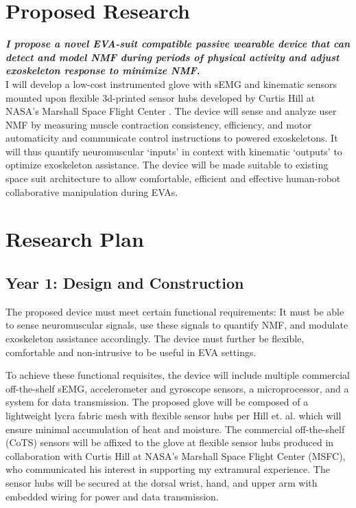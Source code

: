 \documentclass{article}
\begin{document}
\section{Proposed Research}

\textbf{\emph{I propose a novel EVA-suit compatible passive wearable device that can detect and model NMF during periods of physical activity and adjust exoskeleton response to minimize NMF.}}\\

I will develop a low-cost instrumented glove with sEMG and kinematic sensors mounted upon flexible 3d-printed sensor hubs developed by Curtis Hill at NASA's Marshall Space Flight Center \cite{CurtisHillFlexible2020}. The device will sense and analyze user NMF by measuring muscle contraction consistency, efficiency, and motor automaticity \cite{Celik2010NormalizedMQ} and communicate control instructions to powered exoskeletons. It will thus quantify neuromuscular ‘inputs’ in context with kinematic ‘outputs’ to optimize exoskeleton assistance. The device will be made suitable to existing space suit architecture to allow comfortable, efficient and effective human-robot collaborative manipulation during EVAs.

\section{Research Plan}
\subsection{Year 1: Design and Construction} 
The proposed device must meet certain functional requirements: It must be able to sense neuromuscular signals, use these signals to quantify NMF, and modulate exoskeleton assistance accordingly. The device must further be flexible, comfortable and non-intrusive to be useful in EVA settings.

To achieve these functional requisites, the device will include multiple commercial off-the-shelf sEMG, accelerometer and gyroscope sensors, a microprocessor, and a system for data transmission. The proposed glove will be composed of a lightweight lycra fabric mesh with flexible sensor hubs per Hill et. al. \cite{CurtisHillFlexible2020} which will ensure minimal accumulation of heat and moisture. The commercial off-the-shelf (CoTS) sensors will be affixed to the glove at flexible sensor hubs produced in collaboration with Curtis Hill at NASA's Marshall Space Flight Center (MSFC), who communicated his interest in supporting my extramural experience. The sensor hubs will be secured at the dorsal wrist, hand, and upper arm with embedded wiring for power and data transmission.
\end{document}
